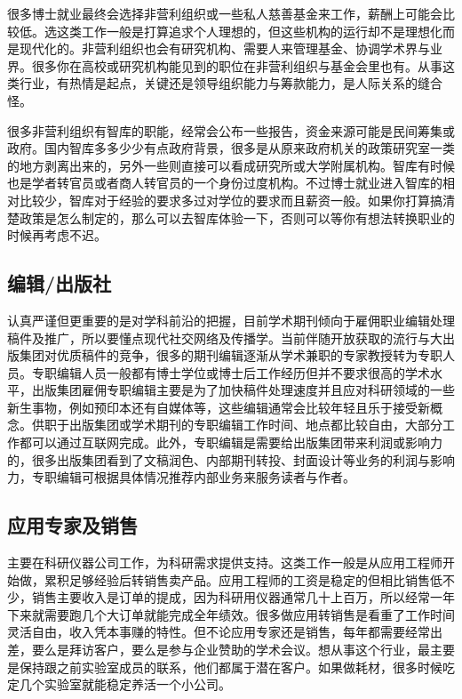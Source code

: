 \documentclass[]{tufte-book}
\begin{document}
很多博士就业最终会选择非营利组织或一些私人慈善基金来工作，薪酬上可能会比较低。选这类工作一般是打算追求个人理想的，但这些机构的运行却不是理想化而是现代化的。非营利组织也会有研究机构、需要人来管理基金、协调学术界与业界。很多你在高校或研究机构能见到的职位在非营利组织与基金会里也有。从事这类行业，有热情是起点，关键还是领导组织能力与筹款能力，是人际关系的缝合怪。

很多非营利组织有智库的职能，经常会公布一些报告，资金来源可能是民间筹集或政府。国内智库多多少少有点政府背景，很多是从原来政府机关的政策研究室一类的地方剥离出来的，另外一些则直接可以看成研究所或大学附属机构。智库有时候也是学者转官员或者商人转官员的一个身份过度机构。不过博士就业进入智库的相对比较少，智库对于经验的要求多过对学位的要求而且薪资一般。如果你打算搞清楚政策是怎么制定的，那么可以去智库体验一下，否则可以等你有想法转换职业的时候再考虑不迟。

\hypertarget{ux7f16ux8f91ux51faux7248ux793e}{%
\subsection{编辑/出版社}\label{ux7f16ux8f91ux51faux7248ux793e}}

认真严谨但更重要的是对学科前沿的把握，目前学术期刊倾向于雇佣职业编辑处理稿件及推广，所以要懂点现代社交网络及传播学。当前伴随开放获取的流行与大出版集团对优质稿件的竞争，很多的期刊编辑逐渐从学术兼职的专家教授转为专职人员。专职编辑人员一般都有博士学位或博士后工作经历但并不要求很高的学术水平，出版集团雇佣专职编辑主要是为了加快稿件处理速度并且应对科研领域的一些新生事物，例如预印本还有自媒体等，这些编辑通常会比较年轻且乐于接受新概念。供职于出版集团或学术期刊的专职编辑工作时间、地点都比较自由，大部分工作都可以通过互联网完成。此外，专职编辑是需要给出版集团带来利润或影响力的，很多出版集团看到了文稿润色、内部期刊转投、封面设计等业务的利润与影响力，专职编辑可根据具体情况推荐内部业务来服务读者与作者。

\hypertarget{ux5e94ux7528ux4e13ux5bb6ux53caux9500ux552e}{%
\subsection{应用专家及销售}\label{ux5e94ux7528ux4e13ux5bb6ux53caux9500ux552e}}

主要在科研仪器公司工作，为科研需求提供支持。这类工作一般是从应用工程师开始做，累积足够经验后转销售卖产品。应用工程师的工资是稳定的但相比销售低不少，销售主要收入是订单的提成，因为科研用仪器通常几十上百万，所以经常一年下来就需要跑几个大订单就能完成全年绩效。很多做应用转销售是看重了工作时间灵活自由，收入凭本事赚的特性。但不论应用专家还是销售，每年都需要经常出差，要么是拜访客户，要么是参与企业赞助的学术会议。想从事这个行业，最主要是保持跟之前实验室成员的联系，他们都属于潜在客户。如果做耗材，很多时候吃定几个实验室就能稳定养活一个小公司。
\end{document}
